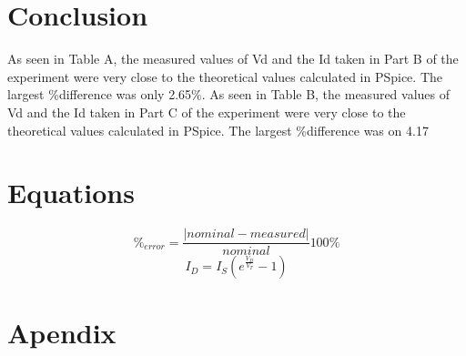 \documentclass{article}
\begin{document}
\section{Conclusion}
\label{sec:conclusion}

As seen in Table A, the measured values of Vd and the Id taken in Part
B of the experiment were very close to the theoretical values
calculated in PSpice. The largest \%difference was only 2.65\%.  As seen
in Table B, the measured values of Vd and the Id taken in Part C of
the experiment were very close to the theoretical values calculated in
PSpice. The largest \%difference was on 4.17%

\section{Equations}
\label{sec:equations}

\begin{equation}
  \label{eqn:percent_err}
  \%_{error} = \frac{|nominal - measured|}{nominal}100\%
\end{equation}
%
\begin{equation}
  \label{eqn:schlockley}
  I_D = I_S \left(e^{\frac{V_D}{V_T}} - 1\right)
\end{equation}

\section{Apendix}
\label{sec:appendix}
\end{document}
